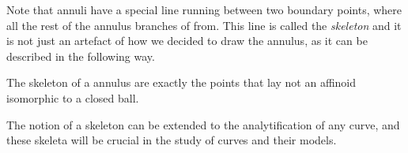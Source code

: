 Note that annuli have a special line running between two boundary points, where all the rest of the annulus branches of from. This line is called the \emph{skeleton} and it is not just an artefact of how we decided to draw the annulus, as it can be described in the following way. 
\begin{proposition}
	The skeleton of a annulus are exactly the points that lay not an affinoid isomorphic to a closed ball.  
\end{proposition}

The notion of a skeleton can be extended to the analytification of any curve, and these skeleta will be crucial in the study of curves and their models. 

